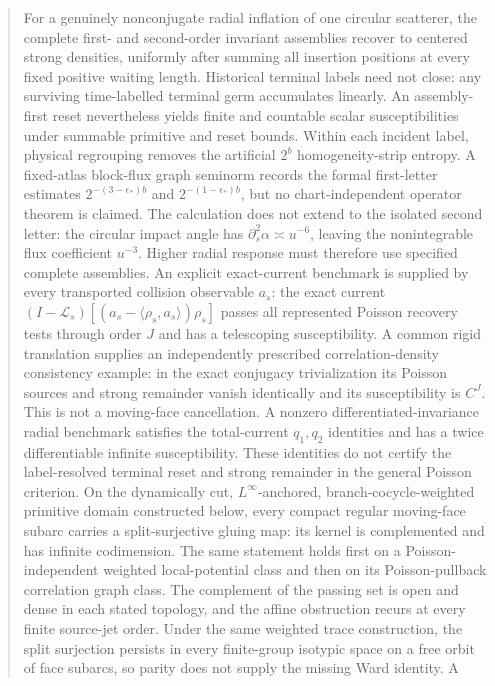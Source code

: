 \documentclass[11pt]{amsart}
\theoremstyle{compactplain}
\theoremstyle{compactdefinition}
\theoremstyle{compactremark}
\begin{document}
\begin{abstract}
For a genuinely nonconjugate radial inflation of one circular scatterer, the
complete first- and second-order invariant assemblies recover to centered
strong densities, uniformly after summing all insertion positions at every
fixed positive waiting length.  Historical terminal labels need not close:
any surviving time-labelled terminal germ accumulates linearly.  An
assembly-first reset nevertheless yields finite and countable scalar
susceptibilities under summable primitive and reset bounds.  Within each
incident label, physical regrouping removes the artificial \(2^b\)
homogeneity-strip entropy.  A fixed-atlas block-flux graph seminorm records
the formal first-letter estimates \(2^{-(3-\epsilon_*)b}\) and
\(2^{-(1-\epsilon_*)b}\), but no chart-independent operator theorem is
claimed.  The calculation does not extend to
the isolated second letter: the circular impact angle has
\(\partial_s^2\alpha\asymp u^{-6}\), leaving the nonintegrable flux
coefficient \(u^{-3}\).  Higher radial response must therefore use specified
complete assemblies.  An explicit exact-current benchmark is supplied by every transported
collision observable \(a_s\): the exact current
\((I-\mathscr L_s)[(a_s-\langle\rho_s,a_s\rangle)\rho_s]\) passes all
represented Poisson recovery tests through order \(J\) and has a telescoping
susceptibility.  A common rigid translation supplies an independently
prescribed correlation-density consistency example: in the exact conjugacy
trivialization its Poisson sources and strong remainder vanish identically and
its susceptibility is \(C^J\).  This is not a moving-face cancellation.  A nonzero
differentiated-invariance radial benchmark satisfies
the total-current \(q_1,q_2\) identities and has a twice differentiable
infinite susceptibility.  These identities do not certify the label-resolved
terminal reset and strong remainder in the general Poisson criterion.
On the dynamically cut, \(L^\infty\)-anchored, branch-cocycle-weighted
primitive domain constructed below, every compact regular moving-face subarc
carries a split-surjective gluing map:
its kernel is complemented and has infinite codimension.  The same statement
holds first on a Poisson-independent weighted local-potential class and then on
its Poisson-pullback correlation graph class.  The complement of the passing
set is open and dense in each stated topology, and
the affine obstruction recurs at every finite source-jet order.  Under the
same weighted trace construction, the split surjection persists in every
finite-group isotypic space on a free orbit
of face subarcs, so parity does not supply the missing Ward identity.  A

\end{abstract}
\end{document}
